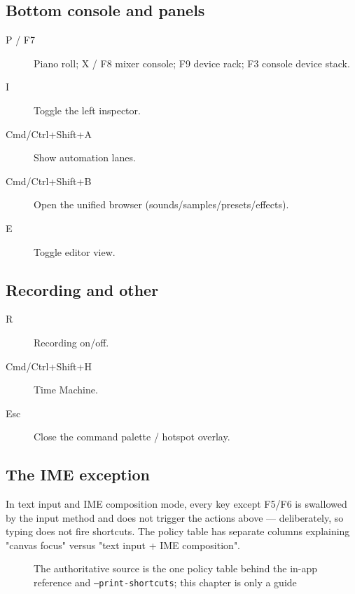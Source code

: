 \subsection{Bottom console and panels}

\begin{description}
  \item[P / F7] Piano roll; X / F8 mixer console; F9 device rack; F3 console device stack.
  \item[I] Toggle the left inspector.
  \item[Cmd/Ctrl+Shift+A] Show automation lanes.
  \item[Cmd/Ctrl+Shift+B] Open the unified browser (sounds/samples/presets/effects).
  \item[E] Toggle editor view.
\end{description}

\subsection{Recording and other}

\begin{description}
  \item[R] Recording on/off.
  \item[Cmd/Ctrl+Shift+H] Time Machine.
  \item[Esc] Close the command palette / hotspot overlay.
\end{description}

\subsection{The IME exception}

In text input and IME composition mode, every key except F5/F6 is swallowed by the
input method and does not trigger the actions above — deliberately, so typing does not
fire shortcuts. The policy table has separate columns explaining "canvas focus"
versus "text input + IME composition".


\begin{figure}[htbp]
\centering
{}
\caption{The authoritative source is the one policy table behind the in-app reference and \texttt{--print-shortcuts}; this chapter is only a guide}
\label{fig:ch09-shortcut-source}
\end{figure}

